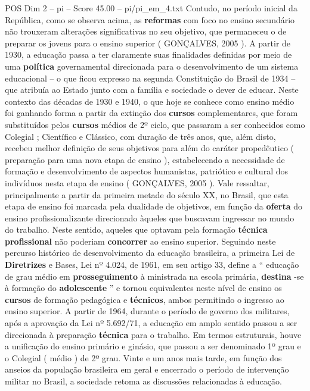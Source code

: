 \begin{textsample}{POS Dim 2 – pi – Score 45.00 – pi/pi\_em\_4.txt}
Contudo, no período inicial da República, como se observa acima, as \textbf{reformas} com foco no ensino secundário não trouxeram alterações significativas no seu objetivo, que permaneceu o de preparar os jovens para o ensino superior ( GONÇALVES, 2005 ).
A partir de 1930, a educação passa a ter claramente suas finalidades definidas por meio de uma \textbf{política} governamental direcionada para o desenvolvimento de um sistema educacional – o que ficou expresso na segunda Constituição do Brasil de 1934 – que atribuía ao Estado junto com a família e sociedade o dever de educar.
Neste contexto das décadas de 1930 e 1940, o que hoje se conhece como ensino médio foi ganhando forma a partir da extinção dos \textbf{cursos} complementares, que foram substituídos pelos \textbf{cursos} médios de 2º ciclo, que passaram a ser conhecidos como Colegial ; Científico e Clássico, com duração de três anos, que, além disto, recebeu melhor definição de seus objetivos para além do caráter propedêutico ( preparação para uma nova etapa de ensino ), estabelecendo a necessidade de formação e desenvolvimento de aspectos humanistas, patriótico e cultural dos indivíduos nesta etapa de ensino ( GONÇALVES, 2005 ).
Vale ressaltar, principalmente a partir da primeira metade do século XX, no Brasil, que esta etapa de ensino foi marcada pela dualidade de objetivos, em função da \textbf{oferta} do ensino profissionalizante direcionado àqueles que buscavam ingressar no mundo do trabalho.
Neste sentido, aqueles que optavam pela formação \textbf{técnica} \textbf{profissional} não poderiam \textbf{concorrer} ao ensino superior.
Seguindo neste percurso histórico de desenvolvimento da educação brasileira, a primeira Lei de \textbf{Diretrizes} e Bases, Lei nº 4.024, de 1961, em seu artigo 33, define a “ educação de grau médio em \textbf{prosseguimento} à ministrada na escola primária, \textbf{destina} -se à formação do \textbf{adolescente} ” e tornou equivalentes neste nível de ensino os \textbf{cursos} de formação pedagógica e \textbf{técnicos}, ambos permitindo o ingresso ao ensino superior.
A partir de 1964, durante o período de governo dos militares, após a aprovação da Lei nº 5.692/71, a educação em amplo sentido passou a ser direcionada à preparação \textbf{técnica} para o trabalho.
Em termos estruturais, houve a unificação do ensino primário e ginásio, que passou a ser denominado 1º grau e o Colegial ( médio ) de 2º grau.
Vinte e um anos mais tarde, em função dos anseios da população brasileira em geral e encerrado o período de intervenção militar no Brasil, a sociedade retoma as discussões relacionadas à educação.

\end{textsample}
